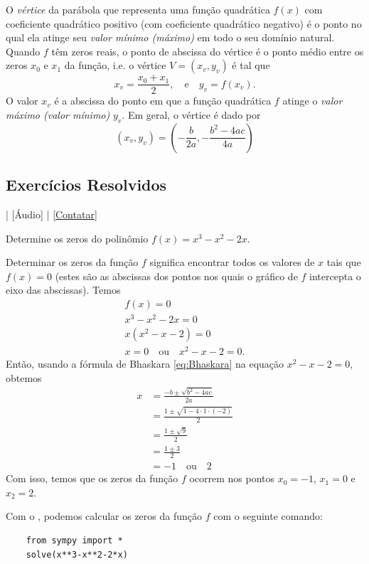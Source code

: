 O \emph{vértice} da parábola que representa uma função quadrática $f(x)$ com coeficiente quadrático positivo (com coeficiente quadrático negativo) é o ponto no qual ela atinge seu \emph{valor mínimo (máximo)} em todo o seu domínio natural. Quando $f$ têm zeros reais, o ponto de abscissa do vértice é o ponto médio entre os zeros $x_0$ e $x_1$ da função, i.e. o vértice $V = (x_v, y_v)$ é tal que
\begin{equation}
  x_v = \frac{x_0 + x_1}{2},\quad\text{e}\quad y_v = f(x_v). 
\end{equation}
O valor $x_v$ é a abscissa do ponto em que a função quadrática $f$ atinge o \emph{valor máximo (valor mínimo)} $y_v$. Em geral, o vértice é dado por
\begin{equation}
  (x_v,y_v) = \left(-\frac{b}{2a},-\frac{b^2-4ac}{4a}\right)
\end{equation}

\subsection*{Exercícios Resolvidos}

\begin{flushright}
  [Vídeo] | [Áudio] | \href{https://phkonzen.github.io/notas/contato.html}{[Contatar]}
\end{flushright}

\begin{exeresol}
  Determine os zeros do polinômio $f(x) = x^3-x^2-2x$.
\end{exeresol}
\begin{resol}
  Determinar os zeros da função $f$ significa encontrar todos os valores de $x$ tais que $f(x)=0$ (estes são as abscissas dos pontos nos quais o gráfico de $f$ intercepta o eixo das abscissas). Temos
  \begin{gather}
    f(x)=0\\
    x^3-x^2-2x=0\\
    x(x^2-x-2)=0\\
    x=0\quad\text{ou}\quad x^2-x-2=0.
  \end{gather}
  Então, usando a fórmula de Bhaskara \eqref{eq:Bhaskara} na equação $x^2-x-2=0$, obtemos
  \begin{align}
    x &= \frac{-b\pm\sqrt{b^2-4ac}}{2a} \\
      &= \frac{1\pm\sqrt{1-4\cdot 1\cdot (-2)}}{2}\\
      &= \frac{1\pm\sqrt{9}}{2}\\
      &= \frac{1\pm 3}{2}\\
      &= -1\quad\text{ou}\quad 2
  \end{align}
  Com isso, temos que os zeros da função $f$ ocorrem nos pontos $x_0 = -1$, $x_1=0$ e $x_2=2$.

  \ifispython
  Com o {\sympy}, podemos calcular os zeros da função $f$ com o seguinte comando:
  \begin{lstlisting}
    from sympy import *
    solve(x**3-x**2-2*x)
  \end{lstlisting}
  \fi
\end{resol}

